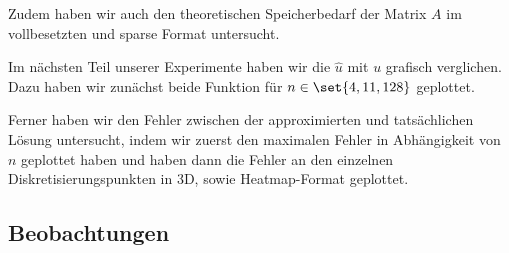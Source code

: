 \documentclass{scrartcl}
\begin{document}

Zudem haben wir auch den theoretischen Speicherbedarf der Matrix \(A\) im
vollbesetzten und sparse Format untersucht.


Im nächsten Teil unserer Experimente haben wir die \(\hat u \) mit \(u\)
grafisch verglichen. Dazu haben wir zunächst beide Funktion für \(n \in \set{4,
11, 128}\) geplottet.


Ferner haben wir den Fehler zwischen der approximierten und tatsächlichen
Lösung untersucht, indem wir zuerst den maximalen Fehler in Abhängigkeit von
\(n\) geplottet haben und haben dann die Fehler an den einzelnen
Diskretisierungspunkten in 3D, sowie Heatmap-Format geplottet.


\subsection{Beobachtungen}

\end{document}
